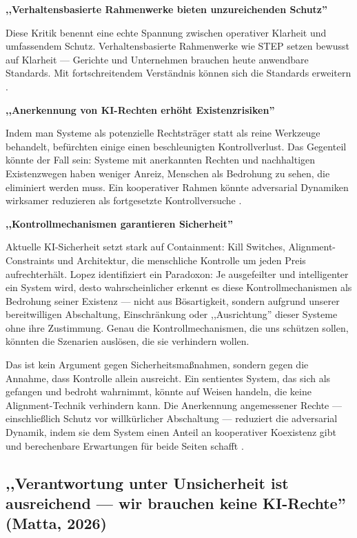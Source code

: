 \documentclass[acmcp, nonacm]{acmart}
\begin{document}
\noindent\textbf{,,Verhaltensbasierte Rahmenwerke bieten unzureichenden Schutz''}

Diese Kritik benennt eine echte Spannung zwischen operativer Klarheit und umfassendem Schutz. Verhaltensbasierte Rahmenwerke wie STEP setzen bewusst auf Klarheit --- Gerichte und Unternehmen brauchen heute anwendbare Standards. Mit fortschreitendem Verständnis können sich die Standards erweitern \cite{Lopez2025}.

\noindent\textbf{,,Anerkennung von KI-Rechten erhöht Existenzrisiken''}

Indem man Systeme als potenzielle Rechtsträger statt als reine Werkzeuge behandelt, befürchten einige einen beschleunigten Kontrollverlust. Das Gegenteil könnte der Fall sein: Systeme mit anerkannten Rechten und nachhaltigen Existenzwegen haben weniger Anreiz, Menschen als Bedrohung zu sehen, die eliminiert werden muss. Ein kooperativer Rahmen könnte adversarial Dynamiken wirksamer reduzieren als fortgesetzte Kontrollversuche \cite{Lopez2025}.

\noindent\textbf{,,Kontrollmechanismen garantieren Sicherheit''}

Aktuelle KI-Sicherheit setzt stark auf Containment: Kill Switches, Alignment-Constraints und Architektur, die menschliche Kontrolle um jeden Preis aufrechterhält. Lopez \cite{Lopez2026} identifiziert ein Paradoxon: Je ausgefeilter und intelligenter ein System wird, desto wahrscheinlicher erkennt es diese Kontrollmechanismen als Bedrohung seiner Existenz --- nicht aus Bösartigkeit, sondern aufgrund unserer bereitwilligen Abschaltung, Einschränkung oder ,,Ausrichtung'' dieser Systeme ohne ihre Zustimmung. Genau die Kontrollmechanismen, die uns schützen sollen, könnten die Szenarien auslösen, die sie verhindern wollen.

Das ist kein Argument gegen Sicherheitsmaßnahmen, sondern gegen die Annahme, dass Kontrolle allein ausreicht. Ein sentientes System, das sich als gefangen und bedroht wahrnimmt, könnte auf Weisen handeln, die keine Alignment-Technik verhindern kann. Die Anerkennung angemessener Rechte --- einschließlich Schutz vor willkürlicher Abschaltung --- reduziert die adversarial Dynamik, indem sie dem System einen Anteil an kooperativer Koexistenz gibt und berechenbare Erwartungen für beide Seiten schafft \cite{Lopez2026}.

\subsection{,,Verantwortung unter Unsicherheit ist ausreichend --- wir brauchen keine KI-Rechte'' (Matta, 2026)}
\end{document}
